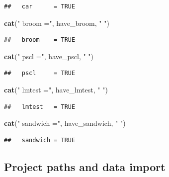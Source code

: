 \documentclass[
]{article}
\newenvironment{Shaded}{\begin{snugshade}}{\end{snugshade}}
\newcommand{\FunctionTok}[1]{\textcolor[rgb]{0.13,0.29,0.53}{\textbf{#1}}}
\newcommand{\NormalTok}[1]{#1}
\newcommand{\StringTok}[1]{\textcolor[rgb]{0.31,0.60,0.02}{#1}}
\begin{document}
\begin{verbatim}
##   car      = TRUE
\end{verbatim}

\begin{Shaded}
\begin{Highlighting}[]
\FunctionTok{cat}\NormalTok{(}\StringTok{"  broom    ="}\NormalTok{, have\_broom, }\StringTok{"}
\StringTok{"}\NormalTok{)}
\end{Highlighting}
\end{Shaded}

\begin{verbatim}
##   broom    = TRUE
\end{verbatim}

\begin{Shaded}
\begin{Highlighting}[]
\FunctionTok{cat}\NormalTok{(}\StringTok{"  pscl     ="}\NormalTok{, have\_pscl, }\StringTok{"}
\StringTok{"}\NormalTok{)}
\end{Highlighting}
\end{Shaded}

\begin{verbatim}
##   pscl     = TRUE
\end{verbatim}

\begin{Shaded}
\begin{Highlighting}[]
\FunctionTok{cat}\NormalTok{(}\StringTok{"  lmtest   ="}\NormalTok{, have\_lmtest, }\StringTok{"}
\StringTok{"}\NormalTok{)}
\end{Highlighting}
\end{Shaded}

\begin{verbatim}
##   lmtest   = TRUE
\end{verbatim}

\begin{Shaded}
\begin{Highlighting}[]
\FunctionTok{cat}\NormalTok{(}\StringTok{"  sandwich ="}\NormalTok{, have\_sandwich, }\StringTok{"}
\StringTok{"}\NormalTok{)}
\end{Highlighting}
\end{Shaded}

\begin{verbatim}
##   sandwich = TRUE
\end{verbatim}

\subsection{Project paths and data
import}\label{project-paths-and-data-import}
\end{document}
